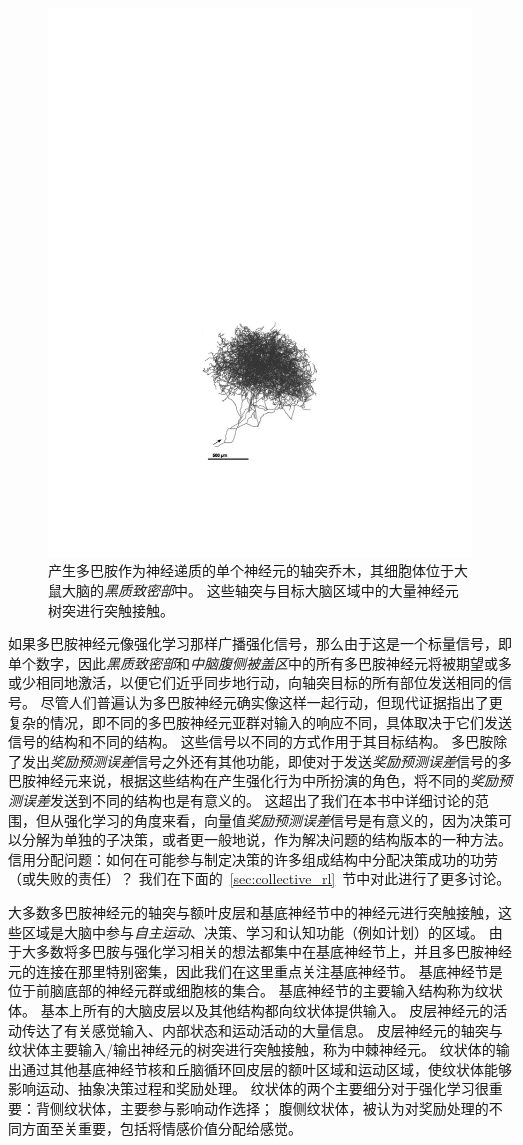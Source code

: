 \begin{figure}[!htb]
	\centering
	\includegraphics[width=0.5\linewidth]{chap12/fig_12_1}
	\caption{产生多巴胺作为神经递质的单个神经元的轴突乔木，其细胞体位于大鼠大脑的\textit{黑质致密部}中。
		这些轴突与目标大脑区域中的大量神经元树突进行突触接触。 \label{fig:12_1}}
\end{figure}


如果多巴胺神经元像强化学习那样广播强化信号，那么由于这是一个标量信号，即单个数字，因此\textit{黑质致密部}和\textit{中脑腹侧被盖区}中的所有多巴胺神经元将被期望或多或少相同地激活，以便它们近乎同步地行动，向轴突目标的所有部位发送相同的信号。 
尽管人们普遍认为多巴胺神经元确实像这样一起行动，但现代证据指出了更复杂的情况，即不同的多巴胺神经元亚群对输入的响应不同，具体取决于它们发送信号的结构和不同的结构。
这些信号以不同的方式作用于其目标结构。
多巴胺除了发出\textit{奖励预测误差}信号之外还有其他功能，即使对于发送\textit{奖励预测误差}信号的多巴胺神经元来说，根据这些结构在产生强化行为中所扮演的角色，将不同的\textit{奖励预测误差}发送到不同的结构也是有意义的。
这超出了我们在本书中详细讨论的范围，但从强化学习的角度来看，向量值\textit{奖励预测误差}信号是有意义的，因为决策可以分解为单独的子决策，或者更一般地说，作为解决问题的结构版本的一种方法。
信用分配问题：如何在可能参与制定决策的许多组成结构中分配决策成功的功劳（或失败的责任）？
我们在下面的~\ref{sec:collective_rl}~节中对此进行了更多讨论。


大多数多巴胺神经元的轴突与额叶皮层和基底神经节中的神经元进行突触接触，这些区域是大脑中参与\textit{自主运动}、决策、学习和认知功能（例如计划）的区域。
由于大多数将多巴胺与强化学习相关的想法都集中在基底神经节上，并且多巴胺神经元的连接在那里特别密集，因此我们在这里重点关注基底神经节。
基底神经节是位于前脑底部的神经元群或细胞核的集合。 基底神经节的主要输入结构称为纹状体。
基本上所有的大脑皮层以及其他结构都向纹状体提供输入。
皮层神经元的活动传达了有关感觉输入、内部状态和运动活动的大量信息。
皮层神经元的轴突与纹状体主要输入/输出神经元的树突进行突触接触，称为中棘神经元。
纹状体的输出通过其他基底神经节核和丘脑循环回皮层的额叶区域和运动区域，使纹状体能够影响运动、抽象决策过程和奖励处理。
纹状体的两个主要细分对于强化学习很重要：背侧纹状体，主要参与影响动作选择；
腹侧纹状体，被认为对奖励处理的不同方面至关重要，包括将情感价值分配给感觉。



